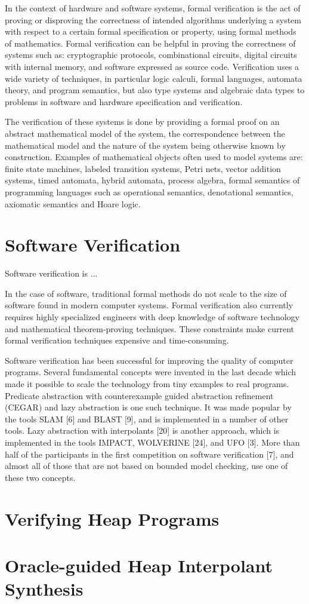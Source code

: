 \label{ch:intro}

In the context of hardware and software systems, formal verification is the act of proving or disproving the correctness of intended algorithms underlying a system with respect to a certain formal specification or property, using formal methods of mathematics. Formal verification can be helpful in proving the correctness of systems such as: cryptographic protocols, combinational circuits, digital circuits with internal memory, and software expressed as source code. Verification uses a wide variety of techniques, in particular logic calculi, formal languages, automata theory, and program semantics, but also type systems and algebraic data types to problems in software and hardware specification and verification.

The verification of these systems is done by providing a formal proof on an abstract mathematical model of the system, the correspondence between the mathematical model and the nature of the system being otherwise known by construction. Examples of mathematical objects often used to model systems are: finite state machines, labeled transition systems, Petri nets, vector addition systems, timed automata, hybrid automata, process algebra, formal semantics of programming languages such as operational semantics, denotational semantics, axiomatic semantics and Hoare logic.

\section{Software Verification}

Software verification is ...

In the case of software, traditional formal methods do not scale to the size of software found in modern computer systems. Formal verification also currently requires highly specialized engineers with deep knowledge of software technology and mathematical theorem-proving techniques. These constraints make current formal verification techniques expensive and time-consuming.

Software verification has been successful for improving
the quality of computer programs. Several fundamental
concepts were invented in the last decade which made it
possible to scale the technology from tiny examples to real
programs. Predicate abstraction \cite{ball01} with counterexample guided
abstraction refinement (CEGAR) \cite{clarke03} and lazy abstraction
\cite{henzinger02} is one such technique. It was made popular
by the tools SLAM [6] and BLAST [9], and is implemented
in a number of other tools. Lazy abstraction with interpolants
[20] is another approach, which is implemented in
the tools IMPACT, WOLVERINE [24], and UFO [3]. More than
half of the participants in the first competition on software
verification [7], and almost all of those that are not based on
bounded model checking, use one of these two concepts.

\section{Verifying Heap Programs}

\section{Oracle-guided Heap Interpolant Synthesis}